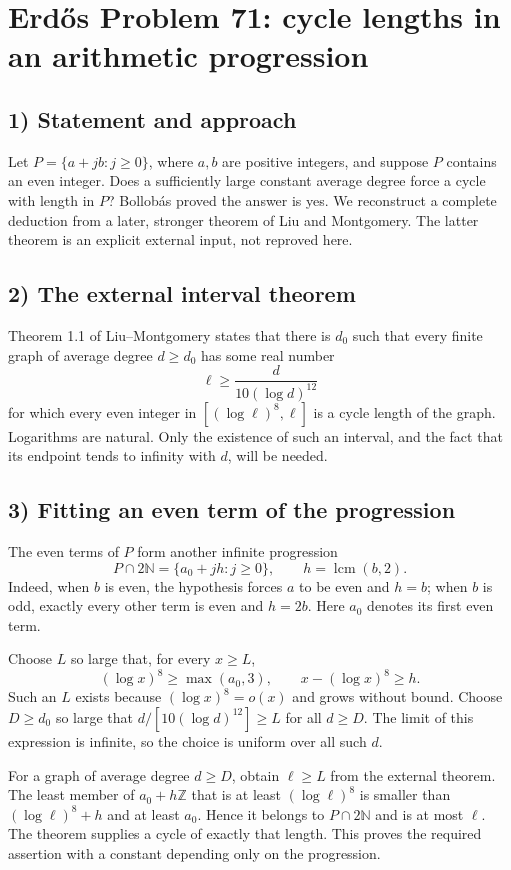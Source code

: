\section{Erd\H{o}s Problem 71: cycle lengths in an arithmetic progression}

\subsection{1) Statement and approach}
Let $P=\{a+jb:j\geq0\}$, where $a,b$ are positive integers, and
suppose $P$ contains an even integer. Does a sufficiently large
constant average degree force a cycle with length in $P$?
Bollob\'as proved the answer is yes. We reconstruct a complete
deduction from a later, stronger theorem of Liu and Montgomery.
The latter theorem is an explicit external input, not reproved here.

\subsection{2) The external interval theorem}
Theorem 1.1 of Liu--Montgomery states that there is $d_0$ such that
every finite graph of average degree $d\geq d_0$ has some real number
\[
 \ell\geq\frac{d}{10(\log d)^{12}}
\]
for which every even integer in $[(\log\ell)^8,\ell]$ is a cycle
length of the graph. Logarithms are natural. Only the existence of
such an interval, and the fact that its endpoint tends to infinity
with $d$, will be needed.

\subsection{3) Fitting an even term of the progression}
The even terms of $P$ form another infinite progression
\[
 P\cap2\mathbb N=\{a_0+jh:j\geq0\},\qquad h=\operatorname{lcm}(b,2).
\]
Indeed, when $b$ is even, the hypothesis forces $a$ to be even and
$h=b$; when $b$ is odd, exactly every other term is even and $h=2b$.
Here $a_0$ denotes its first even term.

Choose $L$ so large that, for every $x\geq L$,
\[
 (\log x)^8\geq\max(a_0,3),\qquad
 x-(\log x)^8\geq h.
\]
Such an $L$ exists because $(\log x)^8=o(x)$ and grows without bound.
Choose $D\geq d_0$ so large that
$d/[10(\log d)^{12}]\geq L$ for all $d\geq D$.
The limit of this expression is infinite, so the choice is uniform
over all such $d$.

For a graph of average degree $d\geq D$, obtain $\ell\geq L$ from
the external theorem. The least member of $a_0+h\mathbb Z$ that is
at least $(\log\ell)^8$ is smaller than $(\log\ell)^8+h$ and at
least $a_0$. Hence it belongs to $P\cap2\mathbb N$ and is at most
$\ell$. The theorem supplies a cycle of exactly that length.
This proves the required assertion with a constant depending only
on the progression.

